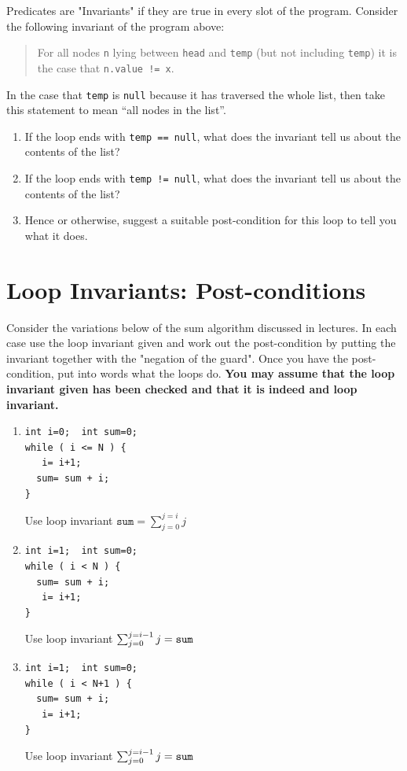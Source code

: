 \documentclass[twoside=false,DIV=14]{scrartcl}
\begin{document}
Predicates are "Invariants" if they are true in every slot of the program.  Consider the following invariant of the program above:

\begin{quotation}
For all nodes {\tt n} lying between {\tt head} and {\tt temp} (but not including {\tt temp}) it is the case that {\tt n.value != x}.
\end{quotation}


In the case that {\tt temp} is {\tt null} because it has traversed the whole list, then take this statement to mean ``all nodes in the list''.

\begin{enumerate}
\item  If the loop ends with {\tt temp == null}, what does the invariant tell us about the contents of the list?

\item  If the loop ends with {\tt temp != null}, what does the invariant tell us about the contents of the list?
\item Hence or otherwise, suggest a suitable post-condition for this loop to tell you what it does.
\end{enumerate}

\section{Loop Invariants: Post-conditions}
 
Consider the variations below of the sum algorithm discussed in lectures. In each case use the loop invariant given and work out the post-condition by putting the invariant together with the "negation of the guard". Once you have the post-condition, put into words what the loops do. {\bf You may assume that the loop invariant given has been checked and that it is indeed and loop invariant.}
 
 \begin{enumerate}
 \item 
 \begin{verbatim}
int i=0;  int sum=0;
while ( i <= N ) {
   i= i+1;
  sum= sum + i;
}
\end{verbatim}
 Use loop invariant $\texttt{sum} = \sum_{j=0}^{j=i} j$
 
  \item 
 \begin{verbatim}
int i=1;  int sum=0;
while ( i < N ) {
  sum= sum + i;
   i= i+1;
}
\end{verbatim}
 Use loop invariant $\sum_{j=0}^{j=i-1} j ={\tt sum}$
 
   \item 
 \begin{verbatim}
int i=1;  int sum=0;
while ( i < N+1 ) {
  sum= sum + i;
   i= i+1;
}
\end{verbatim}
 Use loop invariant $\sum_{j=0}^{j=i-1} j ={\tt sum}$
 
 \end{enumerate} 
\end{document}
